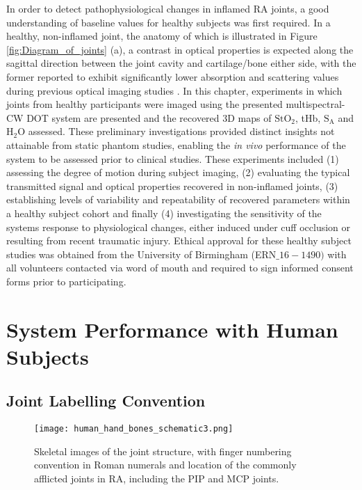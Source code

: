 \documentclass[twoside]{bhamthesis}
\theoremstyle{definition}
\begin{document}
In order to detect pathophysiological changes in inflamed RA joints, a good understanding of baseline values for healthy subjects was first required. In a healthy, non-inflamed joint, the anatomy of which is illustrated in Figure \ref{fig:Diagram_of_joints} (a), a contrast in optical properties is expected along the sagittal direction between the joint cavity and cartilage/bone either side, with the former reported to exhibit significantly lower absorption and scattering values during previous optical imaging studies \cite{montejo2013computer,yuan2007three}. In this chapter, experiments in which joints from healthy participants were imaged using the presented multispectral-CW DOT system are presented and the recovered 3D maps of $\mathrm{StO_2}$, tHb, $\mathrm{S_A}$ and $\mathrm{H_2O}$ assessed. These preliminary investigations provided distinct insights not attainable from static phantom studies, enabling the \textit{in vivo} performance of the system to be assessed prior to clinical studies. These experiments included (1) assessing the degree of motion during subject imaging, (2) evaluating the typical transmitted signal and optical properties recovered in non-inflamed joints, (3) establishing levels of variability and repeatability of recovered parameters within a healthy subject cohort and finally (4) investigating the sensitivity of the systems response to physiological changes, either induced under cuff occlusion or resulting from recent traumatic injury. Ethical approval for these healthy subject studies was obtained from the University of Birmingham (ERN$\_16-1490)$ with all volunteers contacted via word of mouth and required to sign informed consent forms prior to participating.

\section{System Performance with Human Subjects}

\subsection{Joint Labelling Convention}

\begin{figure}[!ht]
\centering\texttt{[image: human\_hand\_bones\_schematic3.png]}
\caption{Skeletal images of the joint structure, with finger numbering convention in Roman numerals and location of the commonly afflicted joints in RA, including the PIP and MCP joints.}
\label{Joint_labelling_convention}
\end{figure}
\end{document}
